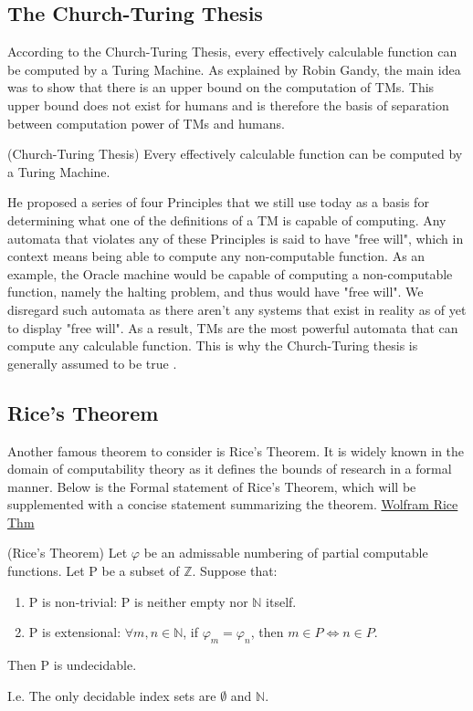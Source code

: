 \subsection{The Church-Turing Thesis}\label{subsec:Church-Turing Thesis}

According to the Church-Turing Thesis, every effectively calculable function can be computed by a Turing Machine.
As explained by Robin Gandy, the main idea was to show that there is an upper bound on the computation of TMs.
This upper bound does not exist for humans and is therefore the basis of separation between computation power of TMs and humans.

\begin{thm}
    \label{thm:CTT}
    (Church-Turing Thesis) Every effectively calculable function can be computed by a Turing Machine.
\end{thm}

He proposed a series of four Principles that we still use today as a basis for determining what one of the definitions of a TM is capable of computing.
Any automata that violates any of these Principles is said to have "free will", which in context means being able to compute any non-computable function.
As an example, the Oracle machine would be capable of computing a non-computable function, namely the halting problem, and thus would have "free will".
We disregard such automata as there aren't any systems that exist in reality as of yet to display "free will".
As a result, TMs are the most powerful automata that can compute any calculable function.
This is why the Church-Turing thesis is generally assumed to be true \cite{GandyPaper}.

\subsection{Rice's Theorem}\label{subsec:RiceThm}

Another famous theorem to consider is Rice's Theorem.
It is widely known in the domain of computability theory as it defines the bounds of research in a formal manner.
Below is the Formal statement of Rice's Theorem, which will be supplemented with a concise statement summarizing the theorem.
\href{https://mathworld.wolfram.com/RicesTheorem.html}{Wolfram Rice Thm}

\begin{thm}
    \label{thm:CTT}
    (Rice's Theorem) Let $\varphi$ be an admissable numbering of partial computable functions. 
    Let P be a subset of $\mathbb{Z}$.
    Suppose that:
    \begin{enumerate}
        \item P is non-trivial: P is neither empty nor $\mathbb{N}$ itself.
        \item P is extensional: $\forall  m,n \in \mathbb{N}$, if $\varphi_{m} = \varphi_{n}$,
        then $m \in P \Leftrightarrow n \in P$.
    \end{enumerate}
    Then P is undecidable.

    I.e. The only decidable index sets are $\emptyset$ and $\mathbb{N}$.
\end{thm}

